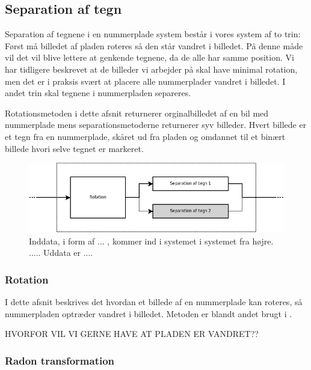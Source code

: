 \subsection{Separation af tegn}

Separation af tegnene i en nummerplade system består i vores system af to trin: Først må billedet af pladen roteres så den står vandret i billedet. På denne måde vil det vil blive lettere at genkende tegnene, da de alle har samme position. Vi har tidligere beskrevet at de billeder vi arbejder på skal have minimal rotation, men det er i praksis svært at placere alle nummerplader vandret i billedet. I andet trin skal tegnene i nummerpladen separeres.


Rotationsmetoden i dette afsnit returnerer orginalbilledet af en bil med nummerplade mens separationsmetoderne returnerer syv billeder. Hvert billede er et tegn fra en nummerplade, skåret ud fra pladen og omdannet til et binært billede hvori selve tegnet er markeret.


\begin{figure}[htp]
\centering
\includegraphics[width=12cm]{system/illu/dia_trin2.png} 
\caption{Inddata, i form af ... , kommer ind i systemet i systemet fra højre. ..... Uddata er ....}
\label{fig:dia_trin2}
\end{figure}

\subsubsection{Rotation}

I dette afsnit beskrives det hvordan et billede af en nummerplade kan roteres, så nummerpladen optræder vandret i billedet. Metoden er blandt andet brugt i \cite{shapiro}.

HVORFOR VIL VI GERNE HAVE AT PLADEN ER VANDRET??

\subsubsection*{Radon transformation}

